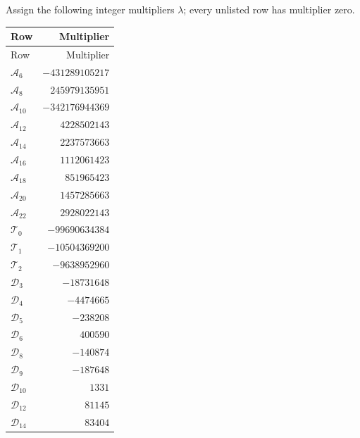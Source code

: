 \documentclass[11pt]{article}
\theoremstyle{remark}
\newcommand{\Arow}[1]{\mathcal A_{#1}}
\newcommand{\Trow}[1]{\mathcal T_{#1}}
\newcommand{\Drow}[1]{\mathcal D_{#1}}
\begin{document}
Assign the following integer multipliers $\lambda$; every unlisted row
has multiplier zero.
\begin{center}
\begin{longtable}{lr}
\toprule
Row&Multiplier\\
\midrule
\endfirsthead
\toprule
Row&Multiplier\\
\midrule
\endhead
$\Arow{6}$&$-431289105217$\\
$\Arow{8}$&$245979135951$\\
$\Arow{10}$&$-342176944369$\\
$\Arow{12}$&$4228502143$\\
$\Arow{14}$&$2237573663$\\
$\Arow{16}$&$1112061423$\\
$\Arow{18}$&$851965423$\\
$\Arow{20}$&$1457285663$\\
$\Arow{22}$&$2928022143$\\
$\Trow{0}$&$-99690634384$\\
$\Trow{1}$&$-10504369200$\\
$\Trow{2}$&$-9638952960$\\
$\Drow{3}$&$-18731648$\\
$\Drow{4}$&$-4474665$\\
$\Drow{5}$&$-238208$\\
$\Drow{6}$&$400590$\\
$\Drow{8}$&$-140874$\\
$\Drow{9}$&$-187648$\\
$\Drow{10}$&$1331$\\
$\Drow{12}$&$81145$\\
$\Drow{14}$&$83404$\\
\bottomrule
\end{longtable}
\end{center}
\end{document}
